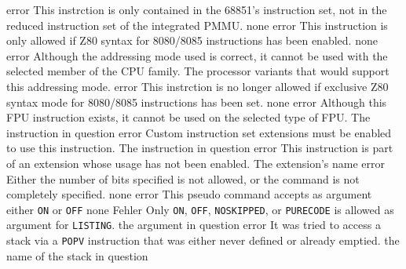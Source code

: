 \documentclass[12pt,twoside]{report}
\newcommand{\tty}[1]{{\tt #1}}
\begin{document}
\begin{description}
               {error}
               {This instrction is only contained in the 68851's
                instruction set, not in the reduced instruction
                set of the integrated PMMU.}
               {none}
               {error}
               {This instruction is only allowed if Z80 syntax
                for 8080/8085 instructions has been enabled.}
               {none}
               {error}
               {Although the addressing mode used is correct, it cannot be
                used with the selected member of the CPU family.}
               {The processor variants that would support this
                addressing mode.}
               {error}
               {This instrction is no longer allowed if exclusive
                Z80 syntax mode for 8080/8085 instructions has been set.}
               {none}
               {error}
               {Although this FPU instruction exists, it cannot be used on
                the selected type of FPU.}
               {The instruction in question}
               {error}
               {Custom instruction set extensions must be enabled
                to use this instruction.}
               {The instruction in question}
               {error}
               {This instruction is part of an extension whose
                usage has not been enabled.}
               {The extension's name}
               {error}
               {Either the number of bits specified is not allowed, or
                the command is not completely specified.}
               {none}
               {error}
               {This pseudo command accepts as argument either \tty{ON} or
                \tty{OFF}}
               {none}
               {Fehler}
               {Only \tty{ON}, \tty{OFF}, \tty{NOSKIPPED}, or
                \tty{PURECODE} is allowed as argument for \tty{LISTING}.}
               {the argument in question}
               {error}
               {It was tried to access a stack via a \tty{POPV} instruction
                that was either never defined or already emptied.}
               {the name of the stack in question}

\end{description}
\end{document}
